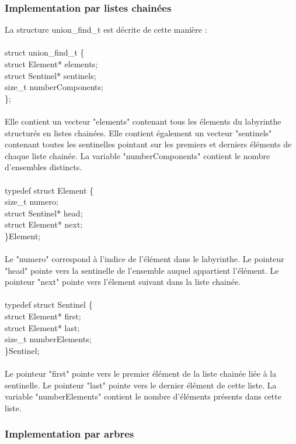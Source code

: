 \documentclass[11pt]{article}
\begin{document}
\subsubsection{Implementation par listes chainées}
La structure union\_find\_t est décrite de cette manière : \\ \\
struct union\_find\_t \{ \\
    struct Element* elements; \\
    struct Sentinel* sentinels; \\
    size\_t numberComponents; \\
\}; \\ \\
Elle contient un vecteur "elements" contenant tous les élements du labyrinthe structurés en listes chainées. Elle contient également un vecteur "sentinels" contenant toutes les sentinelles pointant sur les premiers et derniers éléments de chaque liste chainée. La variable "numberComponents" contient le nombre d'ensembles distincts. \\ \\
typedef struct Element \{\\
    size\_t numero;\\
    struct Sentinel* head;\\
    struct Element* next;\\
\}Element;\\ \\
Le "numero" correspond à l'indice de l'élément dans le labyrinthe. Le pointeur "head" pointe vers la sentinelle de l'ensemble auquel appartient l'élément. Le pointeur "next" pointe vers l'élement suivant dans la liste chainée.\\
\\
typedef struct Sentinel \{ \\
    struct Element* first; \\
    struct Element* last; \\
    size\_t numberElements; \\
\}Sentinel;\\ \\
Le pointeur "first" pointe vers le premier élément de la liste chainée liée à la sentinelle. Le pointeur "last" pointe vers le dernier élément de cette liste. La variable "numberElements" contient le nombre d'éléments présents dans cette liste.
\subsubsection{Implementation par arbres}
\end{document}
